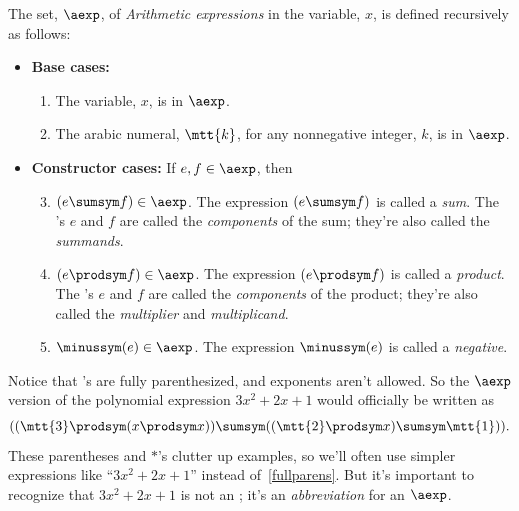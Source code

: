 \begin{definition}\label{A}
The set, $\aexp$, of \emph{Arithmetic expressions} in the variable, $x$,
is defined recursively as follows:

\begin{itemize}
\item \textbf{Base cases:}

\begin{enumerate}

\item The variable, $x$, is in $\aexp$.

\item The arabic numeral, $\mtt{k}$, for any nonnegative integer, $k$, is
  in $\aexp$.

\end{enumerate}

\item \textbf{Constructor cases:} If $e,f \in \aexp$, then
\begin{enumerate}
\setcounter{enumi}{2}

\item $(e \sumsym f) \in \aexp$.  The expression $(e \sumsym f)$ is called a
  \emph{sum}.  The \aexp's $e$ and $f$ are called the \emph{components} of
  the sum; they're also called the \emph{summands}.

\item $(e \prodsym f) \in \aexp$.  The expression $(e \prodsym f)$ is called a
  \emph{product}.  The \aexp's $e$ and $f$ are called the
  \emph{components} of the product; they're also called the
  \emph{multiplier} and \emph{multiplicand}.

\item $\minussym(e) \in \aexp$.  The expression $\minussym(e)$ is called a
  \emph{negative}.
\end{enumerate}
\end{itemize}
\end{definition}

Notice that \aexp's are fully parenthesized, and exponents aren't allowed.
So the $\aexp$ version of the polynomial expression $3x^2 + 2x + 1$ would
officially be written as
\begin{equation}\label{fullparens}
((\mtt{3} \prodsym (x \prodsym x)) \sumsym ((\mtt{2} \prodsym x) \sumsym \mtt{1})).
\end{equation}
These parentheses and $\ast$'s clutter up examples, so we'll often use
simpler expressions like ``$3x^2 + 2x + 1$'' instead
of~\eqref{fullparens}.  But it's important to recognize that $3x^2 +
2x + 1$ is not an \aexp; it's an \emph{abbreviation} for an $\aexp$.

